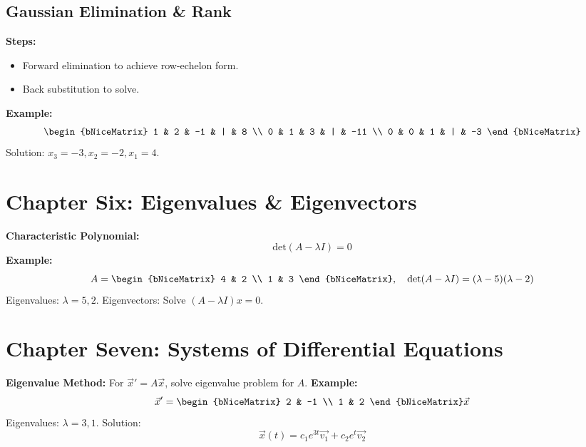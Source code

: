 \documentclass[10pt]{article}
\begin{document}
\begin{multicols}{2}
\subsection*{Gaussian Elimination \& Rank}
\textbf{Steps:}
\begin{itemize}
    \item Forward elimination to achieve row-echelon form.
    \item Back substitution to solve.
\end{itemize}
\textbf{Example:}
\[
\begin{bNiceMatrix}
1 & 2 & -1 & | & 8 \\ 
0 & 1 & 3 & | & -11 \\ 
0 & 0 & 1 & | & -3
\end{bNiceMatrix}
\]
Solution: \( x_3 = -3, x_2 = -2, x_1 = 4 \).

\section*{Chapter Six: Eigenvalues \& Eigenvectors}
\textbf{Characteristic Polynomial:}
\[
\text{det}(A - \lambda I) = 0
\]
\textbf{Example:}
\[
A = \begin{bNiceMatrix}
4 & 2 \\ 
1 & 3
\end{bNiceMatrix}, \quad \text{det}(A - \lambda I) = (\lambda - 5)(\lambda - 2)
\]
Eigenvalues: \( \lambda = 5, 2 \). Eigenvectors: Solve \( (A - \lambda I)x = 0 \).

\section*{Chapter Seven: Systems of Differential Equations}
\textbf{Eigenvalue Method:} For \( \vec{x}' = A\vec{x} \), solve eigenvalue problem for \( A \).  
\textbf{Example:}
\[
\vec{x}' = \begin{bNiceMatrix}
2 & -1 \\ 
1 & 2
\end{bNiceMatrix}\vec{x}
\]
Eigenvalues: \( \lambda = 3, 1 \). Solution:
\[
\vec{x}(t) = c_1e^{3t}\vec{v_1} + c_2e^{t}\vec{v_2}
\]

\end{multicols}
\end{document}
